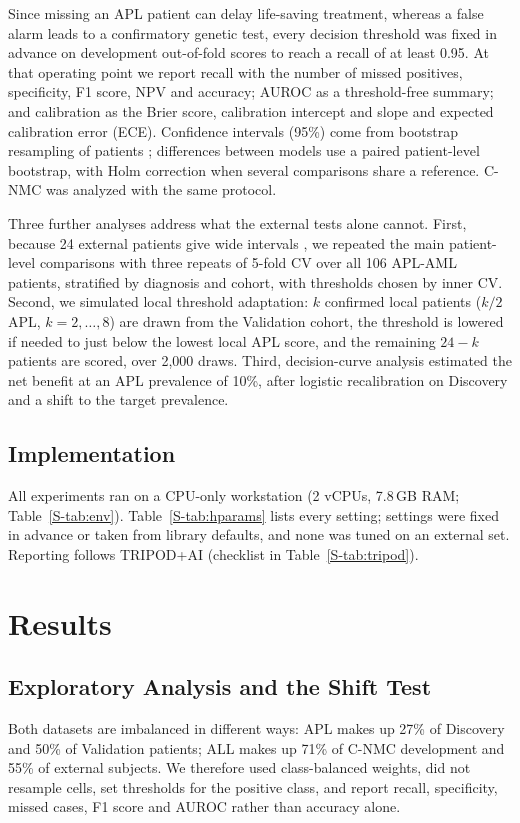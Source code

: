 \documentclass[journal]{IEEEtran}
\begin{document}
Since missing an APL patient can delay life-saving treatment, whereas a false alarm leads to a confirmatory genetic test, every decision threshold was fixed in advance on development out-of-fold scores to reach a recall of at least 0.95. At that operating point we report recall with the number of missed positives, specificity, F1 score, NPV and accuracy; AUROC as a threshold-free summary; and calibration as the Brier score, calibration intercept and slope \cite{vancalster2019calibration} and expected calibration error (ECE). Confidence intervals (95\%) come from bootstrap resampling of patients \cite{efron1986bootstrap}; differences between models use a paired patient-level bootstrap, with Holm correction \cite{holm1979} when several comparisons share a reference. C-NMC was analyzed with the same protocol.

Three further analyses address what the external tests alone cannot. First, because 24 external patients give wide intervals \cite{riley2021samplesize,collins2016samplesize}, we repeated the main patient-level comparisons with three repeats of 5-fold CV over all 106 APL-AML patients, stratified by diagnosis and cohort, with thresholds chosen by inner CV. Second, we simulated local threshold adaptation: $k$ confirmed local patients ($k/2$ APL, $k=2,\dots,8$) are drawn from the Validation cohort, the threshold is lowered if needed to just below the lowest local APL score, and the remaining $24-k$ patients are scored, over 2,000 draws. Third, decision-curve analysis \cite{vickers2006dca} estimated the net benefit at an APL prevalence of 10\%, after logistic recalibration on Discovery and a shift to the target prevalence.

\subsection{Implementation}
All experiments ran on a CPU-only workstation (2 vCPUs, 7.8\,GB RAM; Table~\ref{S-tab:env}). Table~\ref{S-tab:hparams} lists every setting; settings were fixed in advance or taken from library defaults, and none was tuned on an external set. Reporting follows TRIPOD+AI \cite{collins2024tripodai} (checklist in Table~\ref{S-tab:tripod}).

\section{Results}
\subsection{Exploratory Analysis and the Shift Test}
\label{sec:eda}
Both datasets are imbalanced in different ways: APL makes up 27\% of Discovery and 50\% of Validation patients; ALL makes up 71\% of C-NMC development and 55\% of external subjects. We therefore used class-balanced weights, did not resample cells, set thresholds for the positive class, and report recall, specificity, missed cases, F1 score and AUROC rather than accuracy alone.
\end{document}
